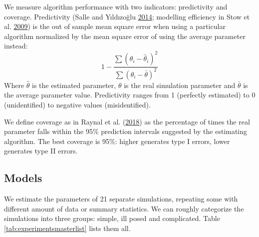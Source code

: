 \documentclass[]{article}
\begin{document}
We measure algorithm performance with two indicators: predictivity and coverage.
Predictivity (Salle and Yıldızoğlu \protect\hyperlink{ref-Salle2014}{2014}; modelling efficiency in Stow et al. \protect\hyperlink{ref-Stow2009}{2009}) is the out of sample mean square error when using a particular algorithm normalized by the mean square error of using the average parameter instead:
\begin{equation} 
 1 - \frac{ \sum \left( \theta_i - \hat \theta_i \right)^2}{ \sum \left( \theta_i - \bar \theta \right)^2} 
\label{eq:predictivitycoefficient}
\end{equation}
Where \(\hat \theta\) is the estimated parameter, \(\theta\) is the real simulation parameter and \(\bar \theta\) is the average parameter value.
Predictivity ranges from 1 (perfectly estimated) to 0 (unidentified) to negative values (misidentified).

We define coverage as in Raynal et al. (\protect\hyperlink{ref-MarixnArxiv}{2018}) as the percentage of times the real parameter falls within the 95\% prediction intervals suggested by the estimating algorithm. The best coverage is 95\%: higher generates type I errors, lower generates type II errors.

\hypertarget{experiments}{%
\subsection{Models}\label{experiments}}

We estimate the parameters of 21 separate simulations, repeating some with different amount of data or summary statistics.
We can roughly categorize the simulations into three groups: simple, ill posed and complicated.
Table \ref{tab:experimentsmasterlist} lists them all.
\end{document}
